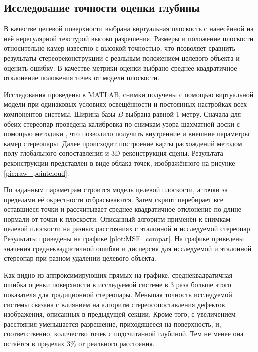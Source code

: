 
\subsection{Исследование точности оценки глубины}  %

В качестве целевой поверхности выбрана виртуальная плоскость с нанесённой на неё нерегулярной текстурой высоко разрешения. Размеры и
положение плоскости относительно камер известно с высокой точностью, что позволяет сравнить результаты стереореконструкции
с реальным положением целевого объекта и оценить ошибку. В качестве метрики оценки выбрано среднее квадратичное отклонение
положения точек от модели плоскости. 

Исследования проведены в MATLAB, снимки получены с помощью виртуальной модели при  одинаковых условиях освещённости и 
постоянных  настройках всех  компонентов системы.  Ширина базы $B$ выбрана равной 1  метру.  Сначала для обеих стереопар 
проведена калибровка по снимкам узора шахматной доски с помощью методики \cite{stereo_calib}, что позволило получить 
внутренние и внешние параметры камер стереопары. %
Далее происходит построение карты расхождений методом полу-глобального  сопоставления \cite{SGBM} и 3D-реконструкция сцены. 
Результата реконструкции представлен  в виде облака точек,  изображённого на рисунке \ref{pic:raw_pointcloud}.

По заданным параметрам строится модель целевой плоскости, а точки за пределами её окрестности отбрасываются. %
Затем скрипт перебирает все оставшиеся точки и рассчитывает среднее квадратичное отклонение по длине нормали от 
точки к плоскости. 
Описанный алгоритм применён к снимкам целевой плоскости на разных расстояниях с эталонной и исследуемой стереопар.
Результаты приведены на графике \ref{plot:MSE_compar}. На графике приведены значения среднеквадратичной ошибки и
дисперсия для исследуемой и эталонной стереопар при разном удалении целевого объекта.


Как видно из аппроксимирующих прямых на графике, среднеквадратичная ошибка оценки поверхности в исследуемой системе
 в 3 раза больше этого показателя для традиционной стереопары. Меньшая точность исследуемой системы связана с влиянием 
на алгоритм стереосопоставления дефектов изображения, описанных в предыдущей секции. Кроме того, с увеличением расстояния
уменьшается разрешение, приходящееся на поверхность, и, соответственно, количество точек с подсчитанной глубиной. 
Тем не менее она остаётся в пределах $3\%$ от реального расстояния.  %


%